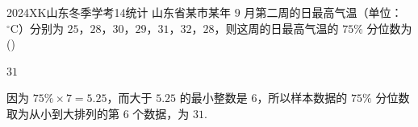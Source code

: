 
\begin{problem}{2024}{XK}{山东冬季学考}{14}{统计}
山东省某市某年 $9$ 月第二周的日最高气温（单位：$^\circ\text{C}$）分别为 $25$，$28$，$30$，$29$，$31$，$32$，$28$，则这周的日最高气温的 $75\%$ 分位数为 (\hspace{1cm})
\begin{choices}
\end{choices}
\end{problem}

\begin{answer}
$31$
\end{answer}

\begin{solutions}
因为 $75\%\times 7=5.25$，而大于 $5.25$ 的最小整数是 $6$，所以样本数据的 $75\%$ 分位数取为从小到大排列的第 $6$ 个数据，为 $31$.
\end{solutions}
